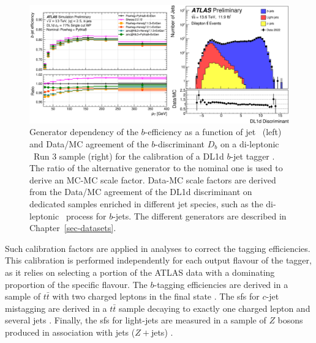 \begin{center}
  \begin{figure}[h!]
  \centerline{
  \includegraphics[width=\textwidth]{Images/FTAG/calib/sfAg.png}
  }
  \caption{Generator dependency of the $b$-efficiency as a function of jet \pt\ (left) and Data/MC agreement of the $b$-discriminant $D_b$ on a di-leptonic \ttb\ Run 3 sample (right) for the calibration of a DL1d $b$-jet tagger \cite{ATL-PLOT-FTAG-2023-01}. The ratio of the alternative generator to the nominal one is used to derive an MC-MC scale factor. Data-MC scale factors are derived from the Data/MC agreement of the DL1d discriminant on dedicated samples enriched in different jet species, such as the di-leptonic \ttb\ process for $b$-jets. The different generators are described in Chapter~\ref{sec-datasets}.}
  \label{fig:calibFtagDL1d}
  \end{figure} 
\end{center}
\vspace{-1cm}
Such calibration factors are applied in analyses to correct the tagging efficiencies. This calibration is performed independently for each output flavour of the tagger, as it relies on selecting a portion of the ATLAS data with a dominating proportion of the specific flavour. The $b$-tagging efficiencies are derived in a sample of $t\bar{t}$ with two charged leptons in the final state \cite{Aad:2019aic}. The \glspl{sf} for $c$-jet mistagging are derived in a $t\bar{t}$ sample decaying to exactly one charged lepton and several jets \cite{cjettaggingCalib}. Finally, the \glspl{sf} for light-jets are measured in a sample of $Z$ bosons produced in association with jets ($Z+$jets) \cite{ATLAS:2023lwk}. \\ %

